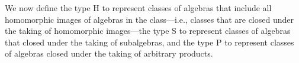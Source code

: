 We now define the type \af H to represent classes of algebras that include all homomorphic images of algebras in the class---i.e., classes that are closed under the taking of homomorphic images---the type \af S to represent classes of algebras that closed under the taking of subalgebras, and the type \af P to represent classes of algebras closed under the taking of arbitrary products.
\fi

\begin{code}%
\>[0]\<%
\\
\>[0]\AgdaSpace{}%
\AgdaModule{\AgdaUnderscore{}}\AgdaSpace{}%
\AgdaSymbol{\{}\AgdaSpace{}%
\AgdaSpace{}%
\AgdaSpace{}%
\AgdaSpace{}%
\AgdaSymbol{:}\AgdaSpace{}%
\AgdaSymbol{\}}\AgdaSpace{}%
\<%
\\
\>[0][@{}l@{\AgdaIndent{0}}]%
\>[1]\AgdaSpace{}%
\AgdaSpace{}%
\AgdaSymbol{=}\AgdaSpace{}%
\AgdaSpace{}%
\AgdaSpace{}%
\<%
\\
%
\>[1]\AgdaSpace{}%
\AgdaSymbol{:}\AgdaSpace{}%
\AgdaSpace{}%
\AgdaSpace{}%
\AgdaSpace{}%
\AgdaSymbol{(}\AgdaSpace{}%
\AgdaSpace{}%
\AgdaSymbol{)}\AgdaSpace{}%
\AgdaSymbol{(}\AgdaSpace{}%
\AgdaSpace{}%
\AgdaSpace{}%
\AgdaSymbol{)}\AgdaSpace{}%
\AgdaSpace{}%
\AgdaSymbol{(}\AgdaSpace{}%
\AgdaSpace{}%
\AgdaSymbol{)}\AgdaSpace{}%
\AgdaSymbol{\AgdaUnderscore{}}\<%
\\
%
\>[1]\AgdaSpace{}%
\AgdaSymbol{\AgdaUnderscore{}}\AgdaSpace{}%
\AgdaSpace{}%
\AgdaSpace{}%
\AgdaSymbol{=}\AgdaSpace{}%
\AgdaFunction{Σ[}\AgdaSpace{}%
\AgdaSpace{}%
\AgdaSpace{}%
\AgdaSpace{}%
\AgdaSpace{}%
\AgdaSpace{}%
\AgdaFunction{]}\AgdaSpace{}%
\AgdaSpace{}%
\AgdaSpace{}%
\AgdaSpace{}%
\AgdaSpace{}%
\AgdaSpace{}%
\AgdaSpace{}%
\<%
\\
%
\\[\AgdaEmptyExtraSkip]%
%
\>[1]\AgdaSpace{}%

\end{code}
